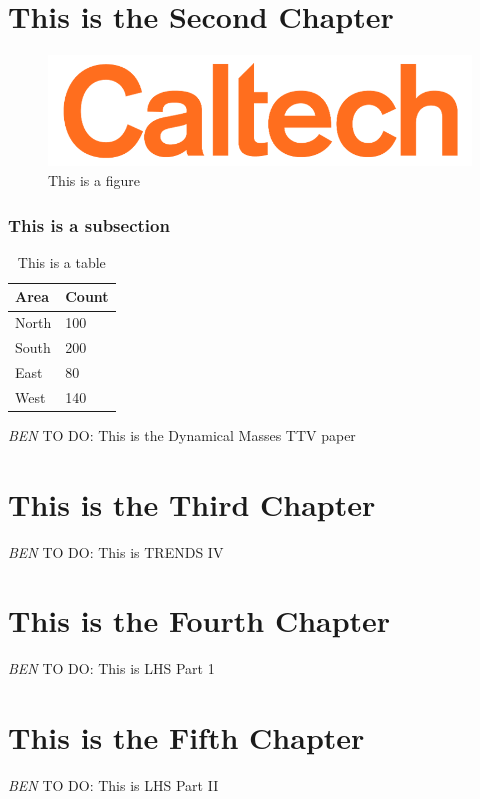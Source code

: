 \documentclass[12pt]{caltech_thesis}
\newcommand{\todo}[3]{{\color{#2} \emph{#1} TO DO: #3}}
\newcommand{\btmtodo}[1]{\todo{BEN}{red}{#1}}
\begin{document}
\chapter{This is the Second Chapter}


\begin{figure}[hbt!]
\centering
\includegraphics[width=.3\textwidth]{caltech.png}
\caption[Example Figure]{This is a figure}
\label{fig:logo}
\end{figure}

\subsection{This is a subsection}

\begin{table}[hbt!]
\centering
\begin{tabular}{ll}
\hline
Area & Count\\
\hline
North & 100\\
South & 200\\
East & 80\\
West & 140\\
\hline
\end{tabular}
\caption[Table]{This is a table}
\label{tab:sample}
\end{table}



\btmtodo{This is the Dynamical Masses TTV paper}


\chapter{This is the Third Chapter}



\btmtodo{This is TRENDS IV}

\chapter{This is the Fourth Chapter}

\btmtodo{This is LHS Part 1}
\chapter{This is the Fifth Chapter}

\btmtodo{This is LHS Part II}
\label{chap:lhsspitz}
\end{document}
